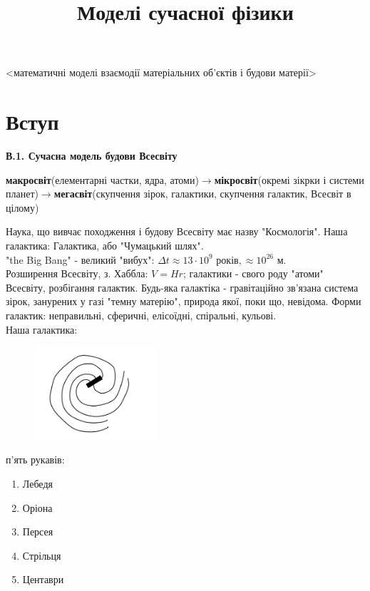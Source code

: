 \documentclass[a4paper,12pt]{article}
\begin{document}
\title{Моделі сучасної фізики}
\maketitle
\date{ }
<математичні моделі взаємодії матеріальних об'єктів і будови матерії>

\newpage
\tableofcontents
\newpage
\section{Вступ}
\textbf{В.1. Сучасна модель будови Всесвіту}

\textbf{макросвіт}(елементарні частки, ядра, атоми)$\rightarrow$\textbf{мікросвіт}(окремі зікрки і системи планет)$\rightarrow$\textbf{мегасвіт}(скупчення зірок, галактики, скупчення галактик, Всесвіт в цілому)

Наука, що вивчає походження і будову Всесвіту має назву "Космологія".
Наша галактика: Галактика, або "Чумацький шлях".
\\"the Big Bang" - великий "вибух": $\Delta t\approx 13\cdot 10^9 \textrm{ років}, \approx 10^{26}\textrm{ м}.$
\\Розширення Всесвіту, з. Хаббла: $V=Hr$; галактики - свого роду "атоми" Всесвіту, розбігання галактик.
Будь-яка галактіка - гравітаційно зв'язана система зірок, занурених у газі "темну матерію", природа якої, поки що, невідома. Форми галактик: неправильні, сферичні, елісоїдні, спіральні, кульові.\\
Наша галактика:

\begin{figure}
\centering
\includegraphics[width=0.4\textwidth]{galaxy}
\end{figure}
п'ять рукавів:\begin{enumerate}
	\item Лебедя
\item Оріона
\item Персея
\item Стрільця
\item Центаври
\end{enumerate}
\end{document}
